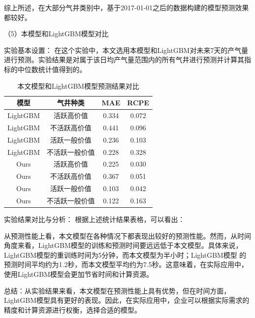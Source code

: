 综上所述，在大部分气井类别中，基于2017-01-01之后的数据构建的模型预测效果都较好。

（5）本模型和LightGBM模型对比

实验基本设置： 在这个实验中，本文选用本模型和LightGBM对未来7天的产气量进行预测。实验结果是对属于该日均产气量范围内的所有气井进行预测并计算其指标的中位数统计值得到的。
\begin{table}[H]
    \renewcommand{\arraystretch}{1.5}
    \centering
    \caption{本文模型和LightGBM模型预测结果对比}
    \label{tab:prediction_comparison}
    \begin{tabular}{|c|c|c|c|}
    \hline
    模型     & 气井种类 & MAE & RCPE \\ \hline
    LightGBM & 活跃高价值       &0.334            & 0.072 \\ \hline
    LightGBM & 不活跃高价值     & 0.441           & 0.096    \\ \hline
    LightGBM & 活跃一般价值      & 0.236           & 0.103    \\ \hline
    LightGBM & 不活跃一般价值      & 0.228           & 0.328    \\ \hline
    Ours      & 活跃高价值        &0.225            &0.030      \\ \hline
    Ours      & 不活跃高价值      & 0.367           & 0.051   \\ \hline
    Ours      & 活跃一般价值      & 0.103           & 0.042    \\ \hline
    Ours      &不活跃一般价值      & 0.122           & 0.163    \\ \hline
    \end{tabular}
\end{table}

实验结果对比与分析： 根据上述统计结果表格，可以看出：

从预测性能上看，本文模型在各种情况下都表现出较好的预测性能。然而，从时间角度来看，LightGBM模型的训练和预测时间要远远低于本文模型。具体来说，LightGBM模型的重训练时间为5分钟，而本文模型为半小时；LightGBM模型
的预测时间平均约为1.2秒，而本文模型平均约为7.5秒。这意味着，在实际应用中，使用LightGBM模型会更加节省时间和计算资源。

总结：从实验结果来看，本文模型在预测性能上具有优势，但在时间方面，LightGBM模型具有更好的表现。因此，在实际应用中，企业可以根据实际需求的精度和计算资源进行权衡，选择合适的模型。
